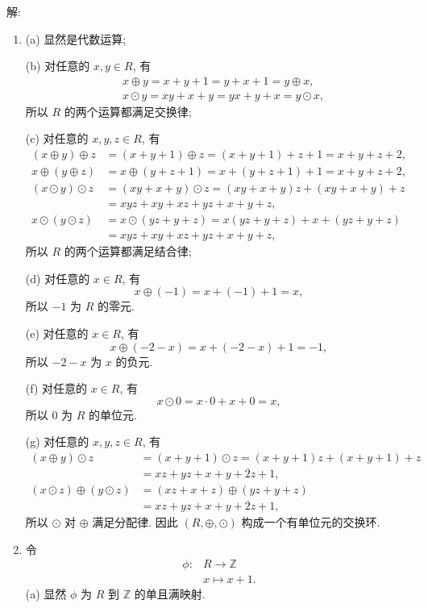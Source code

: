 \documentclass[a4paper,12pt]{ctexart}
\newcommand{\Z}{\mathbb{Z}}
\begin{document}
    解: \begin{enumerate}[label=(\arabic{*})]
      \item (a) 显然是代数运算;

      (b) 对任意的 $x, y \in R$, 有
      $$
      \begin{aligned}
      &x \oplus y=x+y+1=y+x+1=y \oplus x, \\
      &x \odot y=x y+x+y=y x+y+x=y \odot x,
      \end{aligned}
      $$
      所以 $R$ 的两个运算都满足交换律;

      (c) 对任意的 $x, y, z \in R$, 有
      $$
      \begin{aligned}
      (x \oplus y) \oplus z &=(x+y+1) \oplus z=(x+y+1)+z+1=x+y+z+2, \\
      x \oplus(y \oplus z) &=x \oplus(y+z+1)=x+(y+z+1)+1=x+y+z+2, \\
      (x \odot y) \odot z &=(x y+x+y) \odot z=(x y+x+y) z+(x y+x+y)+z \\
      &=x y z+x y+x z+y z+x+y+z, \\
      x \odot(y \odot z) &=x \odot(y z+y+z)=x(y z+y+z)+x+(y z+y+z) \\
      &=x y z+x y+x z+y z+x+y+z,
      \end{aligned}
      $$
      所以 $ R $ 的两个运算都满足结合律;

      (d) 对任意的 $x \in R$, 有
      $$
      x \oplus(-1)=x+(-1)+1=x,
      $$
      所以 $-1$ 为 $R$ 的零元.

      (e) 对任意的 $x \in R$, 有
      $$
      x \oplus(-2-x)=x+(-2-x)+1=-1,
      $$
      所以 $-2-x$ 为 $x$ 的负元.

      (f) 对任意的 $x \in R$, 有
      $$
      x \odot 0=x \cdot 0+x+0=x,
      $$
      所以 0 为 $R$ 的单位元.
      
      (g) 对任意的 $x, y, z \in R$, 有
      $$
      \begin{aligned}
      (x \oplus y) \odot z &=(x+y+1) \odot z=(x+y+1) z+(x+y+1)+z \\
      &=x z+y z+x+y+2 z+1, \\
      (x \odot z) \oplus(y \odot z) &=(x z+x+z) \oplus(y z+y+z) \\
      &=x z+y z+x+y+2 z+1,
      \end{aligned}
      $$
      所以 $\odot$ 对 $\oplus$ 满足分配律.
      因此 $(R, \oplus, \odot)$ 构成一个有单位元的交换环.
      \item 令
      $$
      \begin{aligned}
      \phi: & R \longrightarrow \Z \\
      & x \longmapsto x+1 .
      \end{aligned}
      $$
      (a) 显然 $\phi$ 为 $R$ 到 $\Z$ 的单且满映射.


\end{enumerate}
\end{document}
